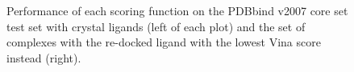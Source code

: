 \begin{figure}
\centering
{}
\caption{Performance of each scoring function on the PDBbind v2007 core set test set with crystal ligands (left of each plot) and the set of complexes with the re-docked ligand with the lowest Vina score instead (right).}
\label{rfscore4:set-1-pdbbind-2007-trn-2}
\end{figure}

